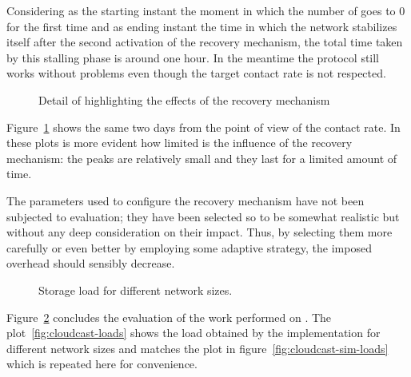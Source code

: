Considering as the starting instant the moment in which the number of
\cloud \descriptors goes to $0$ for the first time and as ending
instant the time in which the network stabilizes itself after the
second activation of the recovery mechanism, the total time taken by
this stalling phase is around one hour. In the meantime the protocol
still works without problems even though the target \cloud contact
rate is not respected.

\begin{figure}[h!]
  \centering
  \caption{Detail of \cloud highlighting the effects of the recovery mechanism}
  \label{fig:cloudcast-dynamic-load-additions-detail}
\end{figure}

Figure~\ref{fig:cloudcast-dynamic-load-additions-detail} shows the
same two days from the point of view of the \cloud contact rate. In
these plots is more evident how limited is the influence of the
recovery mechanism: the peaks are relatively small and they last for a
limited amount of time.

The parameters used to configure the recovery mechanism have not been
subjected to evaluation; they have been selected so to be somewhat
realistic but without any deep consideration on their impact. Thus,
by selecting them more carefully or even better by employing some
adaptive strategy, the imposed overhead should sensibly decrease.

\begin{figure}[h!]
  \centering
  \caption{Storage \cloud load for different network sizes.}
  \label{fig:cloudcast-loads-global}
\end{figure}

Figure~\ref{fig:cloudcast-loads-global} concludes the evaluation of the
work performed on \grapes. The plot~\ref{fig:cloudcast-loads} shows the \cloud
load obtained by the implementation for different network
sizes and matches the plot in figure~\ref{fig:cloudcast-sim-loads} which
is repeated here for convenience.

